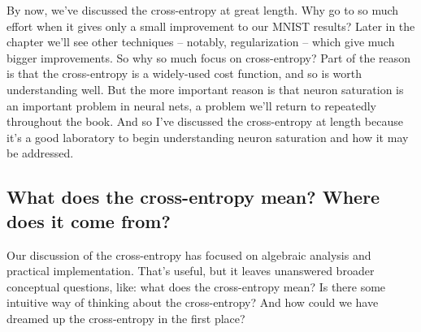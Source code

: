 \documentclass[a4paper,twoside,10pt]{book}
\begin{document}
By now, we've discussed the cross-entropy at great length. Why go to so much effort when it gives only a small improvement to our MNIST results? Later in the chapter we'll see other techniques -- notably, regularization -- which give much bigger improvements. So why so much focus on cross-entropy? Part of the reason is that the cross-entropy is a widely-used cost function, and so is worth understanding well. But the more important reason is that neuron saturation is an important problem in neural nets, a problem we'll return to repeatedly throughout the book. And so I've discussed the cross-entropy at length because it's a good laboratory to begin understanding neuron saturation and how it may be addressed.

\subsection{What does the cross-entropy mean? Where does it come from?}
Our discussion of the cross-entropy has focused on algebraic analysis and practical implementation. That's useful, but it leaves unanswered broader conceptual questions, like: what does the cross-entropy mean? Is there some intuitive way of thinking about the cross-entropy? And how could we have dreamed up the cross-entropy in the first place?
\end{document}
